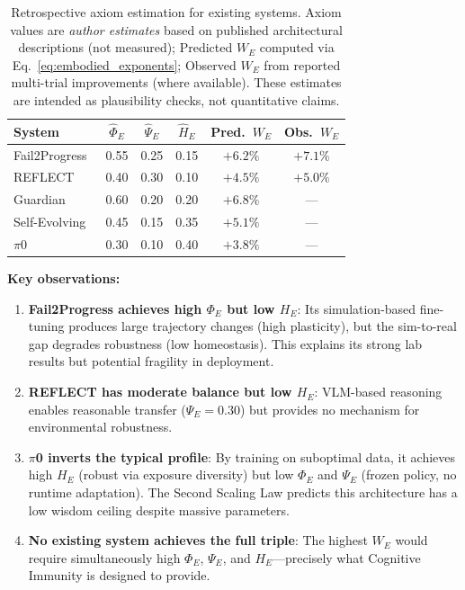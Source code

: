 \documentclass{article}
\begin{document}
\begin{table}[t]
\centering
\caption{Retrospective axiom estimation for existing systems.  Axiom values are \emph{author estimates} based on published architectural descriptions (not measured); Predicted $W_E$ computed via Eq.~\ref{eq:embodied_exponents}; Observed $W_E$ from reported multi-trial improvements (where available).  These estimates are intended as plausibility checks, not quantitative claims.}
\label{tab:explaining}
\begin{tabular}{lccccc}
\toprule
\textbf{System} & $\hat{\Phi}_E$ & $\hat{\Psi}_E$ & $\hat{H}_E$ & Pred.\ $W_E$ & Obs.\ $W_E$ \\
\midrule
Fail2Progress~\citep{huang2025fail2progress} & 0.55 & 0.25 & 0.15 & $+6.2\%$ & $+7.1\%$ \\
REFLECT~\citep{liu2023reflect}               & 0.40 & 0.30 & 0.10 & $+4.5\%$ & $+5.0\%$ \\
Guardian~\citep{guardian2026}                 & 0.60 & 0.20 & 0.20 & $+6.8\%$ & --- \\
Self-Evolving~\citep{selfevolving2025}        & 0.45 & 0.15 & 0.35 & $+5.1\%$ & --- \\
$\pi$0~\citep{pi07_2026}                     & 0.30 & 0.10 & 0.40 & $+3.8\%$ & --- \\
\bottomrule
\end{tabular}
\end{table}

\textbf{Key observations:}

\begin{enumerate}[leftmargin=*,itemsep=2pt]
    \item \textbf{Fail2Progress achieves high $\Phi_E$ but low $H_E$}: Its simulation-based fine-tuning produces large trajectory changes (high plasticity), but the sim-to-real gap degrades robustness (low homeostasis). This explains its strong lab results but potential fragility in deployment.

    \item \textbf{REFLECT has moderate balance but low $H_E$}: VLM-based reasoning enables reasonable transfer ($\Psi_E = 0.30$) but provides no mechanism for environmental robustness.

    \item \textbf{$\pi$0 inverts the typical profile}: By training on suboptimal data, it achieves high $H_E$ (robust via exposure diversity) but low $\Phi_E$ and $\Psi_E$ (frozen policy, no runtime adaptation). The Second Scaling Law predicts this architecture has a low wisdom ceiling despite massive parameters.

    \item \textbf{No existing system achieves the full triple}: The highest $W_E$ would require simultaneously high $\Phi_E$, $\Psi_E$, and $H_E$---precisely what Cognitive Immunity is designed to provide.
\end{enumerate}
\end{document}
